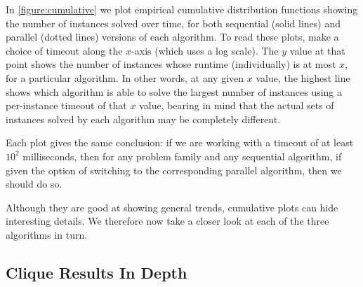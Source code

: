 \documentclass{llncs}
\begin{document}
In \cref{figure:cumulative} we plot empirical cumulative distribution functions showing the number
of instances solved over time, for both sequential (solid lines) and parallel (dotted lines)
versions of each algorithm. To read these plots, make a choice of timeout along the $x$-axis (which
uses a log scale). The $y$ value at that point shows the number of instances whose runtime
(individually) is at most $x$, for a particular algorithm. In other words, at any given $x$ value,
the highest line shows which algorithm is able to solve the largest number of instances using a
per-instance timeout of that $x$ value, bearing in mind that the actual sets of instances solved by
each algorithm may be completely different.

Each plot gives the same conclusion: if we are working with a timeout of at least $10^2$
milliseconds, then for any problem family and any sequential algorithm, if given the option of
switching to the corresponding parallel algorithm, then we should do so.

Although they are good at showing general trends, cumulative plots can hide interesting details. We
therefore now take a closer look at each of the three algorithms in turn.

\subsection{Clique Results In Depth}
\end{document}
